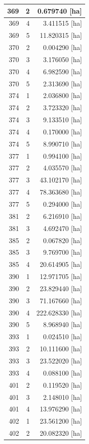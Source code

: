 \documentclass[11pt,]{book}
\begin{document}
\begin{table}
\begin{tabular}[t]{r|r|r}
\hline
369 & 2 & 0.679740 [ha]\\
\hline
369 & 4 & 3.411515 [ha]\\
\hline
369 & 5 & 11.820315 [ha]\\
\hline
370 & 2 & 0.004290 [ha]\\
\hline
370 & 3 & 3.176050 [ha]\\
\hline
370 & 4 & 6.982590 [ha]\\
\hline
370 & 5 & 2.313690 [ha]\\
\hline
374 & 1 & 2.036800 [ha]\\
\hline
374 & 2 & 3.723320 [ha]\\
\hline
374 & 3 & 9.133510 [ha]\\
\hline
374 & 4 & 0.170000 [ha]\\
\hline
374 & 5 & 8.990710 [ha]\\
\hline
377 & 1 & 0.994100 [ha]\\
\hline
377 & 2 & 4.035570 [ha]\\
\hline
377 & 3 & 43.102170 [ha]\\
\hline
377 & 4 & 78.363680 [ha]\\
\hline
377 & 5 & 0.294000 [ha]\\
\hline
381 & 2 & 6.216910 [ha]\\
\hline
381 & 3 & 4.692470 [ha]\\
\hline
385 & 2 & 0.067820 [ha]\\
\hline
385 & 3 & 9.769700 [ha]\\
\hline
385 & 4 & 20.614905 [ha]\\
\hline
390 & 1 & 12.971705 [ha]\\
\hline
390 & 2 & 23.829440 [ha]\\
\hline
390 & 3 & 71.167660 [ha]\\
\hline
390 & 4 & 222.628330 [ha]\\
\hline
390 & 5 & 8.968940 [ha]\\
\hline
393 & 1 & 0.024510 [ha]\\
\hline
393 & 2 & 10.111600 [ha]\\
\hline
393 & 3 & 23.522020 [ha]\\
\hline
393 & 4 & 0.088100 [ha]\\
\hline
401 & 2 & 0.119520 [ha]\\
\hline
401 & 3 & 2.148010 [ha]\\
\hline
401 & 4 & 13.976290 [ha]\\
\hline
402 & 1 & 23.561200 [ha]\\
\hline
402 & 2 & 20.082320 [ha]\\

\end{tabular}
\end{table}
\end{document}
